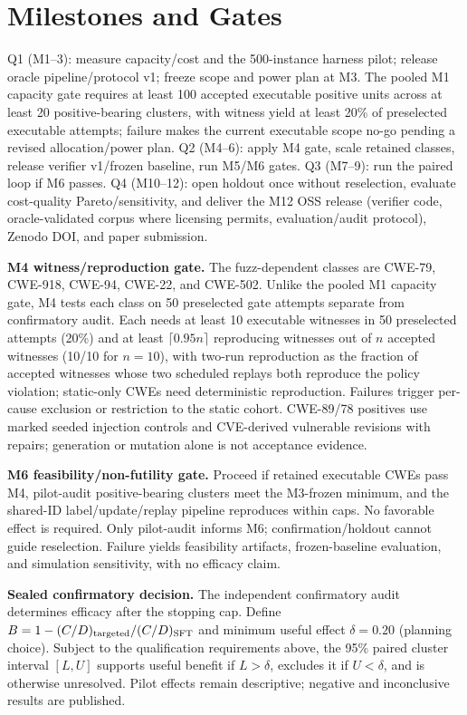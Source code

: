\documentclass[11pt]{article}
\begin{document}
\section*{Milestones and Gates}
Q1 (M1--3): measure capacity/cost and the 500-instance harness pilot; release oracle pipeline/protocol v1; freeze scope and power plan at M3. The pooled M1 capacity gate requires at least 100 accepted executable positive units across at least 20 positive-bearing clusters, with witness yield at least 20\% of preselected executable attempts; failure makes the current executable scope no-go pending a revised allocation/power plan. Q2 (M4--6): apply M4 gate, scale retained classes, release verifier v1/frozen baseline, run M5/M6 gates. Q3 (M7--9): run the paired loop if M6 passes. Q4 (M10--12): open holdout once without reselection, evaluate cost-quality Pareto/sensitivity, and deliver the M12 OSS release (verifier code, oracle-validated corpus where licensing permits, evaluation/audit protocol), Zenodo DOI, and paper submission.

\textbf{M4 witness/reproduction gate.} The fuzz-dependent classes are CWE-79, CWE-918, CWE-94, CWE-22, and CWE-502. Unlike the pooled M1 capacity gate, M4 tests each class on 50 preselected gate attempts separate from confirmatory audit. Each needs at least 10 executable witnesses in 50 preselected attempts (20\%) and at least $\lceil0.95n\rceil$ reproducing witnesses out of $n$ accepted witnesses (10/10 for $n=10$), with two-run reproduction as the fraction of accepted witnesses whose two scheduled replays both reproduce the policy violation; static-only CWEs need deterministic reproduction. Failures trigger per-cause exclusion or restriction to the static cohort. CWE-89/78 positives use marked seeded injection controls and CVE-derived vulnerable revisions with repairs; generation or mutation alone is not acceptance evidence.

\textbf{M6 feasibility/non-futility gate.} Proceed if retained executable CWEs pass M4, pilot-audit positive-bearing clusters meet the M3-frozen minimum, and the shared-ID label/update/replay pipeline reproduces within caps. No favorable effect is required. Only pilot-audit informs M6; confirmation/holdout cannot guide reselection. Failure yields feasibility artifacts, frozen-baseline evaluation, and simulation sensitivity, with no efficacy claim.

\textbf{Sealed confirmatory decision.} The independent confirmatory audit determines efficacy after the stopping cap. Define $B=1-(C/D)_{\rm targeted}/(C/D)_{\rm SFT}$ and minimum useful effect $\delta=0.20$ (planning choice). Subject to the qualification requirements above, the 95\% paired cluster interval $[L,U]$ supports useful benefit if $L>\delta$, excludes it if $U<\delta$, and is otherwise unresolved. Pilot effects remain descriptive; negative and inconclusive results are published.
\end{document}
